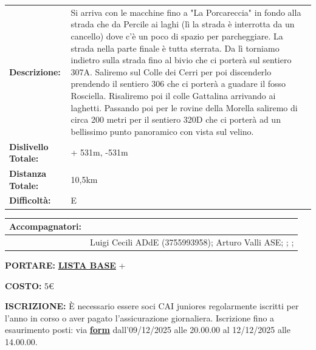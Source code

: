 \documentclass[12pt]{article}
\begin{document}
\noindent
{\small
\begin{tabular}{|p{3.5cm}|p{\dimexpr\textwidth-3.5cm-4\tabcolsep-3\arrayrulewidth\relax}|}
\hline
\rowcolor{celeste}\multicolumn{2}{|l|}{\textbf{PROGRAMMA: lagustelli di Percile}} \\
\hline
\textbf{Descrizione:} & 
{\footnotesize Si arriva con le macchine fino a "La Porcareccia" in fondo alla strada che da Percile ai laghi (lì la strada è interrotta da un cancello) dove c'è un poco di spazio per parcheggiare. La strada nella parte finale è tutta sterrata.
Da lì torniamo indietro sulla strada fino al bivio che ci porterà sul sentiero 307A. Saliremo sul Colle dei Cerri per poi discenderlo prendendo il sentiero 306 che ci porterà a guadare il fosso Rosciella. Risaliremo poi il colle Gattalina arrivando ai laghetti. Passando poi per le rovine della Morella saliremo di circa 200 metri per il sentiero 320D che ci porterà ad un bellissimo punto panoramico con vista sul velino.} \\
\hline
\textbf{Dislivello Totale:} & + 531m, -531m \\
\hline
\textbf{Distanza Totale:} & 10,5km \\
\hline
\textbf{Difficoltà:} & E \\
\hline
\end{tabular}
}

\vspace{0.3cm}

\noindent
{\small
\begin{tabular}{|p{3.5cm}|p{\dimexpr\textwidth-3.5cm-4\tabcolsep-3\arrayrulewidth\relax}|}
\hline
\rowcolor{celeste}\textbf{Accompagnatori:} & \cellcolor{arancione}{Riccardo Gigli ADdE (3311577500)} \\ 
\hline
 & Luigi Cecili ADdE (3755993958); Arturo Valli ASE; ; ;   \\
\hline
\end{tabular}
}

\vspace{0.3cm}

\noindent
{\small
\textbf{PORTARE:} \href{https://www.cairoma.it/?page_id=22206}{\textbf{LISTA BASE}} + 

\vspace{0.2cm}
\noindent
\textbf{COSTO:} 5€

\vspace{0.2cm}
\noindent
\textbf{ISCRIZIONE:} È necessario essere soci CAI juniores regolarmente iscritti per l'anno in corso o aver pagato l'assicurazione giornaliera.
Iscrizione fino a esaurimento posti: via \href{ https://docs.google.com/forms/u/1/d/1sC6MaoNLqkPJJijChK4L9y-7lO1kgov_PVt_VbQIPfU/edit?usp=drive_web&ouid=109075639055926850495}{\textbf{form}} dall'09/12/2025 alle 20.00.00 al 12/12/2025 alle 14.00.00.
}
\end{document}
